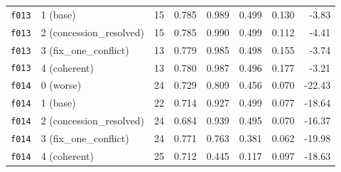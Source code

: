 \documentclass[11pt]{article}
\begin{document}
\begin{table}[htbp]
\begin{tabular}{llrrrrrr}
\texttt{f013} & 1 (base) & 15 & 0.785 & 0.989 & 0.499 & 0.130 & -3.83 \\
\texttt{f013} & 2 (concession\_resolved) & 15 & 0.785 & 0.990 & 0.499 & 0.112 & -4.41 \\
\texttt{f013} & 3 (fix\_one\_conflict) & 13 & 0.779 & 0.985 & 0.498 & 0.155 & -3.74 \\
\texttt{f013} & 4 (coherent) & 13 & 0.780 & 0.987 & 0.496 & 0.177 & -3.21 \\
\midrule
\texttt{f014} & 0 (worse) & 24 & 0.729 & 0.809 & 0.456 & 0.070 & -22.43 \\
\texttt{f014} & 1 (base) & 22 & 0.714 & 0.927 & 0.499 & 0.077 & -18.64 \\
\texttt{f014} & 2 (concession\_resolved) & 24 & 0.684 & 0.939 & 0.495 & 0.070 & -16.37 \\
\texttt{f014} & 3 (fix\_one\_conflict) & 24 & 0.771 & 0.763 & 0.381 & 0.062 & -19.98 \\
\texttt{f014} & 4 (coherent) & 25 & 0.712 & 0.445 & 0.117 & 0.097 & -18.63 \\
\bottomrule
\end{tabular}
\end{table}
\end{document}
